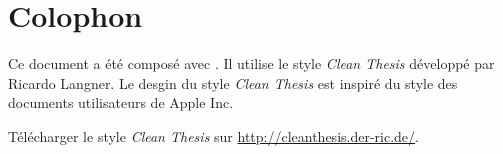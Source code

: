 %
\pagestyle{empty}
\hfill
\vfill
{}
\section*{Colophon}

Ce document a été composé avec \LaTeXe.
Il utilise le style \textit{Clean Thesis} développé par Ricardo Langner.
Le desgin du style \textit{Clean Thesis} est inspiré du style des documents utilisateurs de Apple Inc.

Télécharger le style \textit{Clean Thesis} sur \url{http://cleanthesis.der-ric.de/}.
